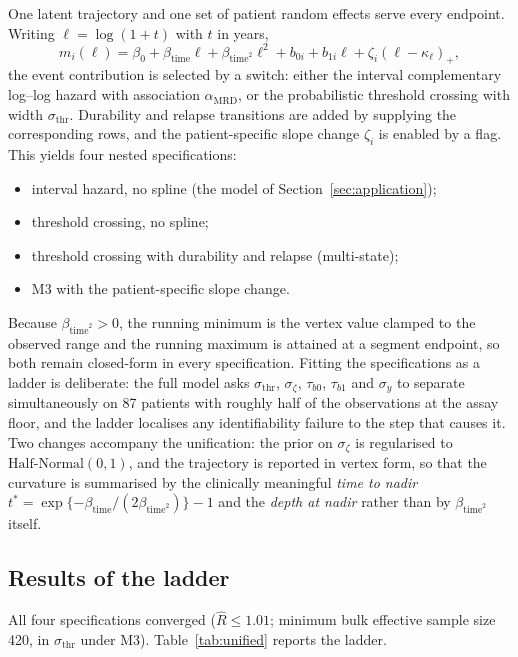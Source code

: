 \documentclass[11pt]{article}
\begin{document}
One latent trajectory and one set of patient random effects serve every
endpoint. Writing $\ell=\log(1+t)$ with $t$ in years,
\[
m_i(\ell)=\beta_0+\beta_{\mathrm{time}}\ell+\beta_{\mathrm{time}^2}\ell^2
+b_{0i}+b_{1i}\ell+\zeta_i(\ell-\kappa_\ell)_+ ,
\]
the event contribution is selected by a switch: either the interval
complementary log--log hazard with association $\alpha_{\mathrm{MRD}}$, or the
probabilistic threshold crossing with width $\sigma_{\mathrm{thr}}$. Durability
and relapse transitions are added by supplying the corresponding rows, and the
patient-specific slope change $\zeta_i$ is enabled by a flag. This yields four
nested specifications:
\begin{itemize}\itemsep2pt
\item[\textbf{M1}] interval hazard, no spline (the model of Section~\ref{sec:application});
\item[\textbf{M2}] threshold crossing, no spline;
\item[\textbf{M3}] threshold crossing with durability and relapse (multi-state);
\item[\textbf{M3s}] M3 with the patient-specific slope change.
\end{itemize}
Because $\beta_{\mathrm{time}^2}>0$, the running minimum is the vertex value
clamped to the observed range and the running maximum is attained at a segment
endpoint, so both remain closed-form in every specification. Fitting the
specifications as a ladder is deliberate: the full model asks
$\sigma_{\mathrm{thr}}$, $\sigma_\zeta$, $\tau_{b0}$, $\tau_{b1}$ and
$\sigma_y$ to separate simultaneously on 87 patients with roughly half of the
observations at the assay floor, and the ladder localises any identifiability
failure to the step that causes it. Two changes accompany the unification: the
prior on $\sigma_\zeta$ is regularised to $\mathrm{Half\text{-}Normal}(0,1)$,
and the trajectory is reported in vertex form, so that the curvature is
summarised by the clinically meaningful \emph{time to nadir}
$t^\ast=\exp\{-\beta_{\mathrm{time}}/(2\beta_{\mathrm{time}^2})\}-1$ and the
\emph{depth at nadir} rather than by $\beta_{\mathrm{time}^2}$ itself.

\subsection{Results of the ladder}

All four specifications converged ($\widehat R\le1.01$; minimum bulk effective
sample size 420, in $\sigma_{\mathrm{thr}}$ under M3). Table~\ref{tab:unified}
reports the ladder.
\end{document}
